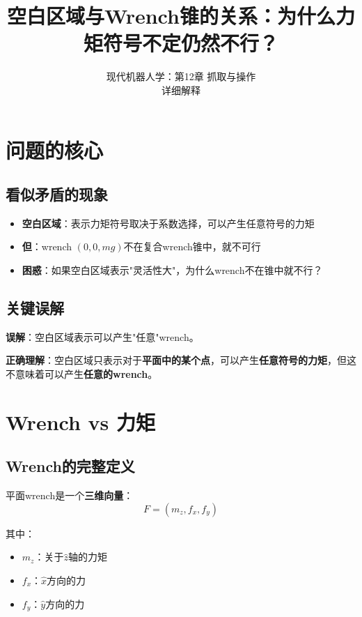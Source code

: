 \documentclass[12pt,a4paper]{article}
\title{空白区域与Wrench锥的关系：为什么力矩符号不定仍然不行？}
\author{现代机器人学：第12章 抓取与操作\\
详细解释}
\date{}
\begin{document}
\maketitle

\section{问题的核心}

\subsection{看似矛盾的现象}

\begin{itemize}
    \item \textbf{空白区域}：表示力矩符号取决于系数选择，可以产生任意符号的力矩
    \item \textbf{但}：wrench $(0, 0, mg)$不在复合wrench锥中，就不可行
    \item \textbf{困惑}：如果空白区域表示"灵活性大"，为什么wrench不在锥中就不行？
\end{itemize}

\subsection{关键误解}

\textbf{误解}：空白区域表示可以产生"任意"wrench。

\textbf{正确理解}：空白区域只表示对于\textbf{平面中的某个点}，可以产生\textbf{任意符号的力矩}，但这不意味着可以产生\textbf{任意的wrench}。

\section{Wrench vs 力矩}

\subsection{Wrench的完整定义}

平面wrench是一个\textbf{三维向量}：
\begin{equation}
F = (m_z, f_x, f_y)
\end{equation}

其中：
\begin{itemize}
    \item $m_z$：关于$\hat{z}$轴的力矩
    \item $f_x$：$\hat{x}$方向的力
    \item $f_y$：$\hat{y}$方向的力
\end{itemize}
\end{document}
